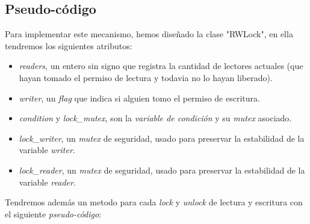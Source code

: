 \subsection{Pseudo-código}

Para implementar este mecanismo, hemos diseñado la clase "RWLock", en ella tendremos los siguientes atributos:
\begin{itemize}
 \item \textit{readers}, un entero sin signo que registra la cantidad de lectores actuales (que hayan tomado el permiso de lectura y todavia no lo hayan liberado).
 \item \textit{writer}, un \textit{flag} que indica si alguien tomo el permiso de escritura.
 \item \textit{condition} y \textit{lock\_mutex}, son la \textit{variable de condición} y su \textit{mutex} asociado.
 \item \textit{lock\_writer}, un \textit{mutex} de seguridad, usado para preservar la estabilidad de la variable \textit{writer}. 
 \item \textit{lock\_reader}, un \textit{mutex} de seguridad, usado para preservar la estabilidad de la variable \textit{reader}. 
\end{itemize}

Tendremos además un metodo para cada \textit{lock} y \textit{unlock} de lectura y escritura con el siguiente \textit{pseudo-código}:

